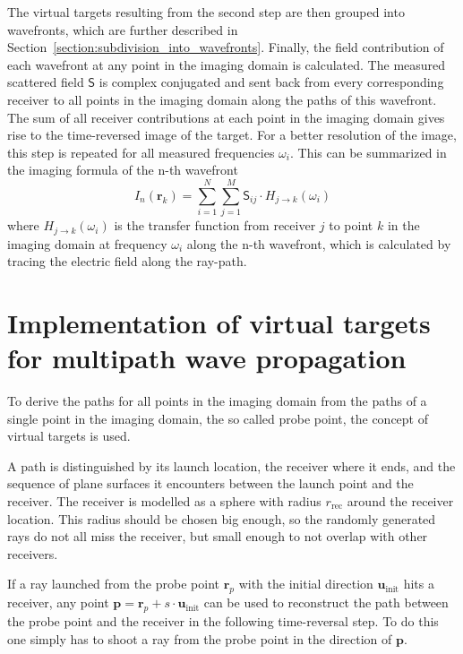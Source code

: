 The virtual targets resulting from the second step are then grouped into wavefronts, which are further described in Section~\ref{section:subdivision_into_wavefronts}.
Finally, the field contribution of each wavefront at any point in the imaging domain is calculated.
The measured scattered field \(\mathsf{S}\) is complex conjugated and sent back from every corresponding receiver to all points in the imaging domain along the paths of this wavefront.
The sum of all receiver contributions at each point in the imaging domain gives rise to the time-reversed image of the target.
For a better resolution of the image, this step is repeated for all measured frequencies \(\omega_i\).
This can be summarized in the imaging formula of the n-th wavefront
\begin{equation}
    I_n(\mathbf{r}_k) = \sum_{i=1}^{N} \sum_{j=1}^{M} \mathsf{S}_{ij} \cdot H_{j \rightarrow k}(\omega_i)
\end{equation}
where \(H_{j \rightarrow k}(\omega_i)\) is the transfer function from receiver \(j\) to point \(k\) in the imaging domain at frequency \(\omega_i\) along the n-th wavefront, which is calculated by tracing the electric field along the ray-path.


\section{Implementation of virtual targets for multipath wave propagation}\label{section:virtual_targets}
To derive the paths for all points in the imaging domain from the paths of a single point in the imaging domain, the so called probe point, the concept of virtual targets is used.

A path is distinguished by its launch location, the receiver where it ends, and the sequence of plane surfaces it encounters between the launch point and the receiver.
The receiver is modelled as a sphere with radius \(r_{\text{rec}}\) around the receiver location.
This radius should be chosen big enough, so the randomly generated rays do not all miss the receiver, but small enough to not overlap with other receivers.

If a ray launched from the probe point \(\mathbf{r}_p\) with the initial direction \(\mathbf{u}_{\text{init}}\) hits a receiver, any point \(\mathbf{p} = \mathbf{r}_p + s \cdot \mathbf{u}_{\text{init}}\) can be used to reconstruct the path between the probe point and the receiver in the following time-reversal step.
To do this one simply has to shoot a ray from the probe point in the direction of \(\mathbf{p}\).

